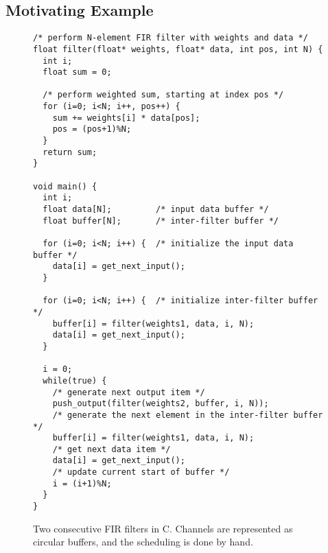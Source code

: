 \subsection{Motivating Example}
\begin{figure}[t]
\vspace{-6pt}
\center
\epsfxsize=2.0in
\vspace{-5pt}
\caption{Block diagram of two FIR filters.}
\scriptsize
\begin{verbatim}
/* perform N-element FIR filter with weights and data */
float filter(float* weights, float* data, int pos, int N) {
  int i;
  float sum = 0;

  /* perform weighted sum, starting at index pos */
  for (i=0; i<N; i++, pos++) {
    sum += weights[i] * data[pos];
    pos = (pos+1)%N;
  }
  return sum;
}

void main() {
  int i;
  float data[N];         /* input data buffer */
  float buffer[N];       /* inter-filter buffer */
  
  for (i=0; i<N; i++) {  /* initialize the input data buffer */
    data[i] = get_next_input();
  }
  
  for (i=0; i<N; i++) {  /* initialize inter-filter buffer */
    buffer[i] = filter(weights1, data, i, N);
    data[i] = get_next_input();
  }
  
  i = 0;
  while(true) {
    /* generate next output item */
    push_output(filter(weights2, buffer, i, N));
    /* generate the next element in the inter-filter buffer */
    buffer[i] = filter(weights1, data, i, N);
    /* get next data item */
    data[i] = get_next_input();
    /* update current start of buffer */
    i = (i+1)%N;
  }
}
\end{verbatim}
\vspace{-18pt}
\caption{Two consecutive FIR filters in C.  Channels are represented
as circular buffers, and the scheduling is done by hand.
\protect\label{fig:motivating-example}}
\vspace{-12pt}
\end{figure}

